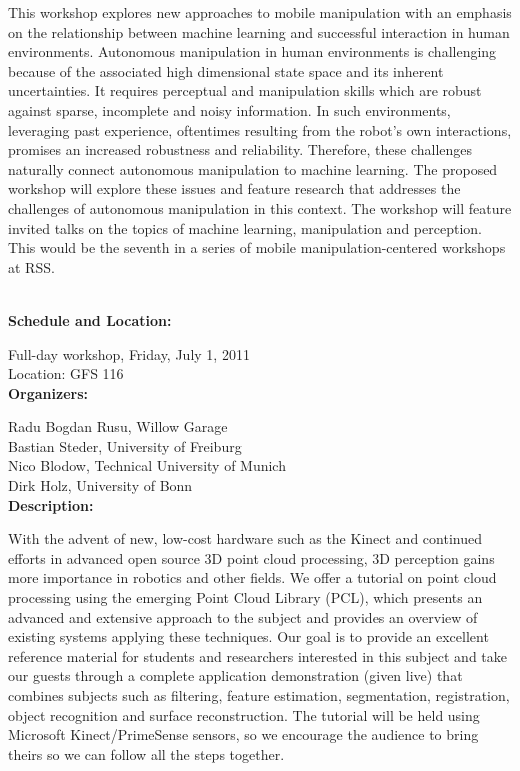 {This workshop explores new approaches to mobile manipulation with an emphasis on the relationship between machine learning and successful interaction in human environments. Autonomous manipulation in human environments is challenging because of the associated high dimensional state space and its inherent uncertainties. It requires perceptual and manipulation skills which are robust against sparse, incomplete and noisy information. In such environments, leveraging past experience, oftentimes resulting from the robot's own interactions, promises an increased robustness and reliability. Therefore, these challenges naturally connect autonomous manipulation to machine learning. The proposed workshop will explore these issues and feature research that addresses the challenges of autonomous manipulation in this context. The workshop will feature invited talks on the topics of machine learning, manipulation and perception. This would be the seventh in a series of mobile manipulation-centered workshops at RSS.



\\[5mm]

{\bf  Schedule and Location:}

Full-day workshop, Friday, July 1, 2011\\
Location: GFS 116 \\[4mm]

{\bf  Organizers:}

Radu Bogdan Rusu, Willow Garage\\
Bastian Steder, University of Freiburg\\
Nico Blodow, Technical University of Munich\\
Dirk Holz, University of Bonn\\[4mm]

{\bf Description: }

With the advent of new, low-cost hardware such as the Kinect and continued efforts in advanced open source 3D point cloud processing, 3D perception gains more importance in robotics and other fields. We offer a tutorial on point cloud processing using the emerging Point Cloud Library (PCL), which presents an advanced and extensive approach to the subject and provides an overview of existing systems applying these techniques. Our goal is to provide an excellent reference material for students and researchers interested in this subject and take our guests through a complete application demonstration (given live) that combines subjects such as filtering, feature estimation, segmentation, registration, object recognition and surface reconstruction. The tutorial will be held using Microsoft Kinect/PrimeSense sensors, so we encourage the audience to bring theirs so we can follow all the steps together.

}
